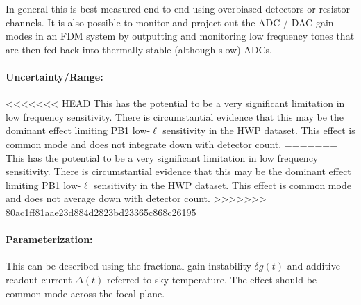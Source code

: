 In general this is best measured end-to-end using overbiased detectors or resistor channels. It is also possible to monitor and project out the ADC / DAC gain modes in an FDM system by outputting and monitoring low frequency tones that are then fed back into thermally stable (although slow) ADCs.

\paragraph{Uncertainty/Range:}

<<<<<<< HEAD
This has the potential to be a very significant limitation in low frequency sensitivity. There is circumstantial evidence that this may be the dominant effect limiting PB1 low-$\ell$ sensitivity in the HWP dataset. This effect is common mode and does not integrate down with detector count.
=======
This has the potential to be a very significant limitation in low frequency sensitivity. There is circumstantial evidence that this may be the dominant effect limiting PB1 low-$\ell$ sensitivity in the HWP dataset. This effect is common mode and does not average down with detector count.
>>>>>>> 80ac1ff81aae23d884d2823bd23365c868c26195

\paragraph{Parameterization:}

This can be described using the fractional gain instability $\delta g(t)$ and additive readout current $\Delta (t)$ referred to sky temperature. The effect should be common mode across the focal plane.
